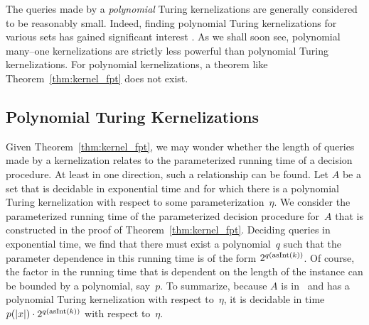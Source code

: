 The queries made by a \emph{polynomial} Turing kernelizations are generally considered to be reasonably small.
Indeed, finding polynomial Turing kernelizations for various sets has gained significant interest \parencite{guo2007invitation,cygan2015parameterized,fomin2019kernelization}.
As we shall soon see, polynomial many--one kernelizations are strictly less powerful than polynomial Turing kernelizations.
For polynomial kernelizations, a theorem like Theorem~\ref{thm:kernel_fpt} does not exist.

\subsection{Polynomial Turing Kernelizations}
Given Theorem~\ref{thm:kernel_fpt}, we may wonder whether the length of queries made by a kernelization relates to the parameterized running time of a decision procedure.
At least in one direction, such a relationship can be found.
Let $A$ be a set that is decidable in exponential time and for which there is a polynomial Turing kernelization with respect to some parameterization~$\eta$.
We consider the parameterized running time of the parameterized decision procedure for~$A$ that is constructed in the proof of Theorem~\ref{thm:kernel_fpt}.
Deciding queries in exponential time, we find that there must exist a polynomial~$q$ such that the parameter dependence in this running time is of the form $2^{q(\operatorname{asInt}(k))}$.
Of course, the factor in the running time that is dependent on the length of the instance can be bounded by a polynomial, say~$p$.
To summarize, because $A$ is in~ and has a polynomial Turing kernelization with respect to~$\eta$, it is decidable in time $p({\lvert x\rvert}) \cdot 2^{q(\operatorname{asInt}(k))}$ with respect to~$\eta$.

